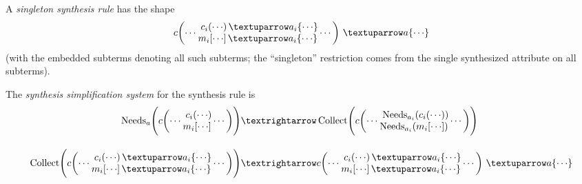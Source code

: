 \documentclass[letterpaper,11pt]{article}
\begin{document}
\begin{definition}\label{def:synth}%
  A \emph{singleton synthesis rule} has the shape
  \begin{displaymath}
    c\biggl(\cdots \vcenter{\txt{
          $c_i({\cdots})\,{{↑}a_i\{{\cdots}\}}$\\
          $m_i[{\cdots}]\,{{↑}a_i\{{\cdots}\}}$
        }}\cdots\biggr)
    ~{{↑}a\{{\cdots}\}}
  \end{displaymath}
  (with the embedded subterms denoting all such subterms; the ``singleton'' restriction comes from
  the single synthesized attribute on all subterms).

  The \emph{synthesis simplification system} for the synthesis rule is
  \begin{align*}
    \op{Needs}_a\Biggl(
    c\biggl(\cdots \vcenter{\txt{
        $c_i({\cdots})$\\
        $m_i[{\cdots}]$
      }}\cdots\biggr)
    \Biggr)
    &→
    \op{Collect}\Biggl(
    c\biggl(\cdots \vcenter{\txt{
        $\op{Needs}_{{a_i}}(c_i({\cdots}))$\\
        $\op{Needs}_{{a_i}}(m_i[{\cdots}])$
      }}\cdots\biggr)    
    \Biggr)
    \\[1em]
    \op{Collect}\Biggl(
    c\biggl(\cdots \vcenter{\txt{
          $c_i({\cdots})\,{↑}a_i\{{\cdots}\}$\\
          $m_i[{\cdots}]\,{↑}a_i\{{\cdots}\}$
      }}\cdots\biggr)
    \Biggr)
    &→
    c\biggl(\cdots \vcenter{\txt{
          $c_i({\cdots})\,{↑}a_i\{{\cdots}\}$\\
          $m_i[{\cdots}]\,{↑}a_i\{{\cdots}\}$
        }}\cdots\biggr)
    ~{↑}a\{{\cdots}\}
  \end{align*}
\end{definition}

\begin{example}
\end{example}

\end{document}
